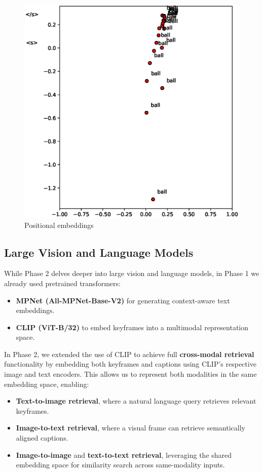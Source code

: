 \documentclass[runningheads]{llncs}
\begin{document}
\begin{figure}
  \centering
  \includegraphics[width=.5\textwidth, clip=true, trim = 15mm 0mm 0mm 0mm]{../figures/pos_embeds.eps}
  \caption{Positional embeddings}\label{pos_embeds}\label{img:positional_embeddings}
\end{figure}

\subsection{Large Vision and Language Models}
While Phase 2 delves deeper into large vision and language models, in Phase 1 we already used pretrained transformers:

\begin{itemize}
    \item \textbf{MPNet (All-MPNet-Base-V2)} for generating context-aware text embeddings.
    \item \textbf{CLIP (ViT-B/32)} to embed keyframes into a multimodal representation space.
\end{itemize}

In Phase 2, we extended the use of CLIP to achieve full \textbf{cross-modal retrieval} functionality by embedding both keyframes and captions using CLIP’s respective image and text encoders. This allows us to represent both modalities in the same embedding space, enabling:

\begin{itemize}
    \item \textbf{Text-to-image retrieval}, where a natural language query retrieves relevant keyframes.

    \item \textbf{Image-to-text retrieval}, where a visual frame can retrieve semantically aligned captions.

    \item \textbf{Image-to-image} and \textbf{text-to-text retrieval}, leveraging the shared embedding space for similarity search across same-modality inputs.
\end{itemize}
\end{document}
